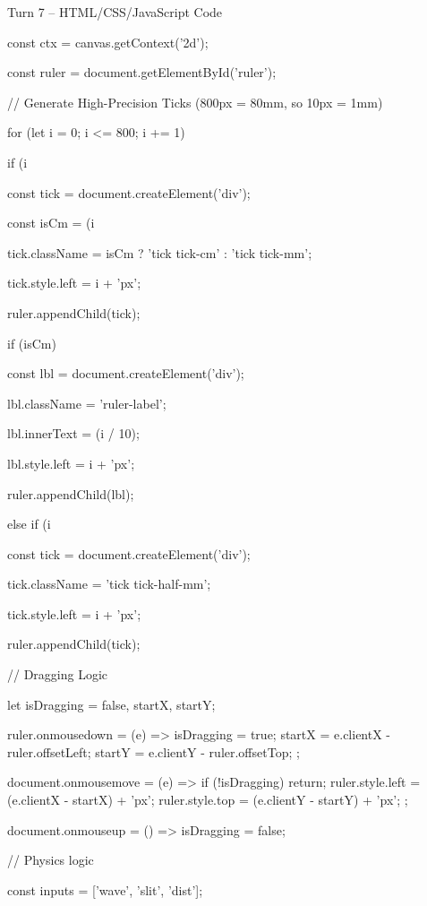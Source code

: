 \documentclass[10pt,a4paper]{article}
\begin{document}
\begin{htmlcodebox}{Turn 7 -- HTML/CSS/JavaScript Code}
{{{{{const ctx = canvas.getContext('2d');

const ruler = document.getElementById('ruler');

// Generate High-Precision Ticks (800px = 80mm, so 10px = 1mm)

for (let i = 0; i <= 800; i += 1) {

    if (i %

        const tick = document.createElement('div');

        const isCm = (i %

        tick.className = isCm ? 'tick tick-cm' : 'tick tick-mm';

        tick.style.left = i + 'px';


        ruler.appendChild(tick);

        if (isCm) {

            const lbl = document.createElement('div');

            lbl.className = 'ruler-label';

            lbl.innerText = (i / 10);

            lbl.style.left = i + 'px';

            ruler.appendChild(lbl);

        }

    } else if (i %

        const tick = document.createElement('div');

        tick.className = 'tick tick-half-mm';

        tick.style.left = i + 'px';

        ruler.appendChild(tick);

    }

}

// Dragging Logic

let isDragging = false, startX, startY;

ruler.onmousedown = (e) => { isDragging = true; startX = e.clientX - ruler.offsetLeft; startY = e.clientY - ruler.offsetTop; };

document.onmousemove = (e) => { if (!isDragging) return; ruler.style.left = (e.clientX - startX) + 'px'; ruler.style.top = (e.clientY - startY) + 'px'; };

document.onmouseup = () => isDragging = false;

// Physics logic

const inputs = ['wave', 'slit', 'dist'];

}}}
\end{htmlcodebox}
\end{document}
